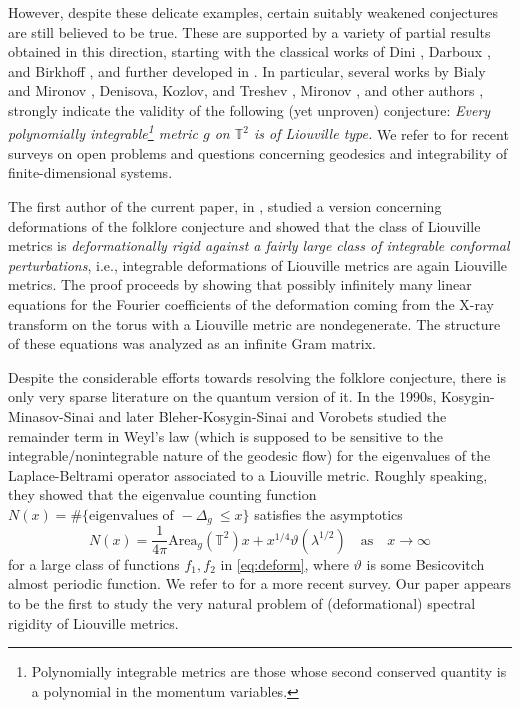 \documentclass[11pt,letterpaper,oneside]{amsart}
\newcommand{\T}{\mathbb{T}}
\renewcommand{\theta}{\vartheta}
\theoremstyle{definition}
\theoremstyle{remark}
\theoremstyle{definition}
\theoremstyle{remark}
\begin{document}
\medskip

However, despite these delicate examples, certain suitably weakened conjectures are still believed to be true. These are supported by a variety of partial results obtained in this direction, starting with the classical works of Dini \cite{Dini43}, Darboux \cite{Darboux37}, and Birkhoff \cite{Birkhoff},  and further developed in \cite{BabNek95,kiyohara1991,kolokoltsov}. In particular, several works by Bialy and Mironov \cite{bialy1987, bialymironov1, bialymironov2, bialymironov3}, Denisova, Kozlov, and Treshev \cite{denisovakozlov1, denisovakozlov2, denisovakozlov3, kozlovtreshchev, denisovakozlovtreshev2012}, Mironov \cite{mironov}, and other authors \cite{babenkoneko1995, kolokoltsov, agapov, taimanov}, strongly indicate the validity of the following (yet unproven) conjecture: \emph{Every polynomially integrable\footnote{Polynomially integrable metrics are those whose second conserved quantity is a polynomial in the momentum variables.} metric $g$ on $\T^2$ is of Liouville type.}
We refer to \cite{probl1, probl2} for recent surveys on open problems and questions concerning geodesics and integrability of finite-dimensional systems. 

\medskip

The first author of the current paper, in \cite{henheik2025deformational}, studied a version concerning deformations of the folklore conjecture and showed that the class of Liouville metrics is \emph{deformationally rigid against a fairly large class of integrable conformal perturbations}, i.e., integrable deformations of Liouville metrics are again Liouville metrics. The proof proceeds by showing that possibly infinitely many linear equations for the Fourier coefficients of the deformation coming from the X-ray transform on the torus with a Liouville metric are nondegenerate. The structure of these equations was analyzed as an infinite Gram matrix. 

\medskip

Despite the considerable efforts towards resolving the folklore conjecture, there is only very sparse literature on the quantum version of it. In the 1990s, Kosygin-Minasov-Sinai \cite{KosyginMinasovSinai} and later Bleher-Kosygin-Sinai \cite{BleherKosyginSinai} and Vorobets \cite{Vorobets} studied the remainder term in Weyl's law (which is supposed to be sensitive to the integrable/nonintegrable nature of the geodesic flow) for the eigenvalues of the Laplace-Beltrami operator associated to a Liouville metric. Roughly speaking, they showed that the eigenvalue counting function $N(x) = \#\{\text{eigenvalues of } -\Delta_g \ \le x\}$ satisfies the asymptotics
\begin{equation}
    N(x) = \frac{1}{4 \pi} \mathrm{Area}_g(\T^2) x + x^{1/4} \theta(\lambda^{1/2}) \quad \text{as} \quad x  \to \infty
\end{equation}
for a large class of functions $f_1, f_2$ in \eqref{eq:deform}, where $\theta$ is  some Besicovitch almost periodic function. We refer to \cite{DAPopov} for a more recent survey. Our paper appears to be the first to study the very natural problem of (deformational) spectral rigidity of Liouville metrics. 
\end{document}
